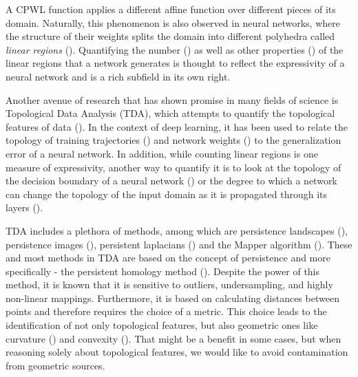 \documentclass[10pt]{article} %
\theoremstyle{plain}
\theoremstyle{definition}
\theoremstyle{remark}
\begin{document}
A CPWL function applies a different affine function over different pieces of its domain. Naturally, this phenomenon is also observed in neural networks, where the structure of their weights splits the domain into different polyhedra called \textit{linear regions} (\cite{pascanu2013number, montufar2014number}). Quantifying the number (\cite{arora2016understanding, raghu2017expressive, serra2018bounding, hanin2019deep}) as well as other properties (\cite{fan2023deep}) of the linear regions that a network generates is thought to reflect the expressivity of a neural network and is a rich subfield in its own right.

Another avenue of research that has shown promise in many fields of science is Topological Data Analysis (TDA), which attempts to quantify the topological features of data (\cite{carlsson2009topology, wasserman2018topological}). In the context of deep learning, it has been used to relate the topology of training trajectories (\cite{birdal2021intrinsic, dupuis2023generalization}) and network weights (\cite{rieck2018neural, gabrielsson2019exposition, gutierrez2021persistent, andreeva2023metric}) to the generalization error of a neural network. In addition, while counting linear regions is one measure of expressivity, another way to quantify it is to look at the topology of the decision boundary of a neural network (\cite{guss2018characterizing, petri2020topological, grigsby2022transversality}) or the degree to which a network can change the topology of the input domain as it is propagated through its layers (\cite{naitzat2020topology, wheeler2021activation}).

TDA includes a plethora of methods, among which are persistence landscapes (\cite{bubenik2015statistical}), persistence images (\cite{adams2017persistence}), persistent laplacians (\cite{memoli2022persistent}) and the Mapper algorithm (\cite{singh2007topological}). These and most methods in TDA are based on the concept of persistence and more specifically - the persistent homology method (\cite{zomorodian2004computing}). Despite the power of this method, it is known that it is sensitive to outliers, undersampling, and highly non-linear mappings. Furthermore, it is based on calculating distances between points and therefore requires the choice of a metric. This choice leads to the identification of not only topological features, but also geometric ones like curvature (\cite{bubenik2020persistent}) and convexity (\cite{turkes2022effectiveness}). That might be a benefit in some cases, but when reasoning solely about topological features, we would like to avoid contamination from geometric sources.
\end{document}
